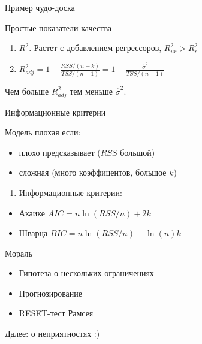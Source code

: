 \documentclass[ignorenonframetext,]{beamer}
\begin{document}
\begin{frame}{Пример чудо-доска}

\end{frame}

\begin{frame}{Простые показатели качества}

\begin{enumerate}
\def\labelenumi{\arabic{enumi}.}
\item
  $R^2$. Растет с добавлением регрессоров, $R^2_{ur}>R^2_r$
\item
  $R^2_{adj}=1-\frac{RSS/(n-k)}{TSS/(n-1)}=1-\frac{\hat{\sigma}^2}{TSS/(n-1)}$
\end{enumerate}

Чем больше $R^2_{adj}$ тем меньше $\hat{\sigma}^2$.

\end{frame}

\begin{frame}{Информационные критерии}

Модель плохая если:

\begin{itemize}
\item
  плохо предсказывает ($RSS$ большой)
\item
  сложная (много коэффицентов, большое $k$)
\end{itemize}

\begin{enumerate}
\def\labelenumi{\arabic{enumi}.}
\setcounter{enumi}{2}
\itemsep1pt\parskip0pt
\item
  Информационные критерии:
\end{enumerate}

\begin{itemize}
\item
  Акаике $AIC=n \ln (RSS/n) + 2k$
\item
  Шварца $BIC=n \ln (RSS/n) + \ln(n) k $
\end{itemize}

\end{frame}

\begin{frame}{Мораль}

\begin{itemize}
\item
  Гипотеза о нескольких ограничениях
\item
  Прогнозирование
\item
  RESET-тест Рамсея
\end{itemize}

Далее: о неприятностях :)

\end{frame}
\end{document}
